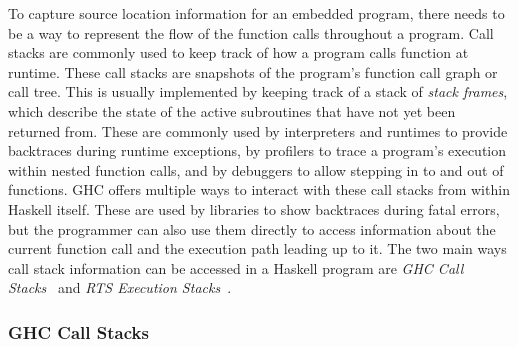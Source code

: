 \documentclass[fontsize=11pt,a4paper,parskip=half,numbers=noenddot]{scrartcl}
\begin{document}

To capture source location information for an embedded program, there needs to
be a way to represent the flow of the function calls throughout a program. Call
stacks are commonly used to keep track of how a program calls function at
runtime. These call stacks are snapshots of the program's function call graph or
call tree. This is usually implemented by keeping track of a stack of
\emph{stack frames}, which describe the state of the active subroutines that
have not yet been returned from. These are commonly used by interpreters and
runtimes to provide backtraces during runtime exceptions, by profilers to trace
a program's execution within nested function calls, and by debuggers to allow
stepping in to and out of functions. GHC offers multiple ways to interact with
these call stacks from within Haskell itself. These are used by libraries to
show backtraces during fatal errors, but the programmer can also use them
directly to access information about the current function call and the execution
path leading up to it. The two main ways call stack information can be accessed
in a Haskell program are \emph{GHC Call Stacks}~\cite{ghc-implicit-locations}
and \emph{RTS Execution Stacks}~\cite{ghc-dwarf-execution-stacks}.

\subsubsection{GHC Call Stacks}\label{sec:ghc-call-stacks}

\end{document}
